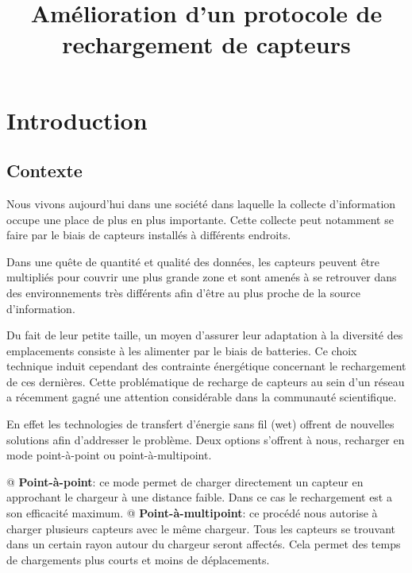\documentclass[final]{polytech/polytech}
\title{Amélioration d'un protocole de rechargement de capteurs}
\begin{document}
\chapter{Introduction}
	\section{Contexte}
		Nous vivons aujourd'hui dans une société dans laquelle la collecte d'information occupe une place de plus en plus importante.
		Cette collecte peut notamment se faire par le biais de capteurs installés à différents endroits.
		
		
		Dans une quête de quantité et qualité des données, les capteurs peuvent être multipliés pour couvrir une plus grande zone et sont amenés à se retrouver dans des environnements très différents afin d'être au plus proche de la source d'information.
		
		Du fait de leur petite taille, un moyen d'assurer leur adaptation à la diversité des emplacements consiste à les alimenter par le biais de batteries.
		Ce choix technique induit cependant des contrainte énergétique concernant le rechargement de ces dernières.
		Cette problématique de recharge de capteurs au sein d'un réseau a récemment gagné une attention considérable dans la communauté scientifique.
		
		En effet les technologies de transfert d'énergie sans fil (\gls{wet}) offrent de nouvelles solutions afin d'addresser le problème.
		Deux options s'offrent à nous, recharger en mode point-à-point ou point-à-multipoint.
		\begin{easylist}[itemize]
			@ \textbf{Point-à-point}: ce mode permet de charger directement un capteur en approchant le chargeur à une distance faible.
			Dans ce cas le rechargement est a son efficacité maximum.
			@ \textbf{Point-à-multipoint}: ce procédé nous autorise à charger plusieurs capteurs avec le même chargeur.
			Tous les capteurs se trouvant dans un certain rayon autour du chargeur seront affectés.
			Cela permet des temps de chargements plus courts et moins de déplacements.
		\end{easylist}
	
\end{document}
